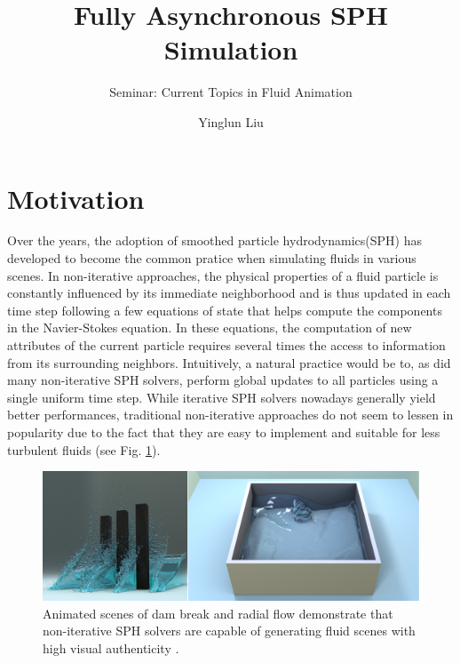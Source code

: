 \documentclass[
	11pt, 
	DIV10,
	ngerman,
	a4paper, 
	oneside, 
	headings=normal, 
	captions=tableheading,
	final, 
	numbers=noenddot
]{scrartcl}
\title{Fully Asynchronous SPH Simulation}
\subtitle{\vspace{0.5cm}Seminar: Current Topics in Fluid Animation}
\author{Yinglun Liu}
\begin{document}
\maketitle


\section{Motivation}

Over the years, the adoption of smoothed particle hydrodynamics(SPH) has developed to become the common pratice when simulating fluids in various scenes. In non-iterative approaches, the physical properties of a fluid particle is constantly influenced by its immediate neighborhood and is thus updated in each time step following a few equations of state that helps compute the components in the Navier-Stokes equation. In these equations, the computation of new attributes of the current particle requires several times the access to information from its surrounding neighbors. Intuitively, a natural practice would be to, as did many non-iterative SPH solvers, perform global updates to all particles using a single uniform time step. While iterative SPH solvers nowadays generally yield better performances, traditional non-iterative approaches do not seem to lessen in popularity due to the fact that they are easy to implement and suitable for less turbulent fluids (see Fig. \ref{fig1}).

\begin{figure}[tb]
	\centering
	\includegraphics[scale=0.2]{images/3}
	\caption{\label{fig1} Animated scenes of dam break and radial flow demonstrate that non-iterative SPH solvers are capable of generating fluid scenes with high visual authenticity \cite{reinhardt2017fully}.
	}
\end{figure}
\end{document}
